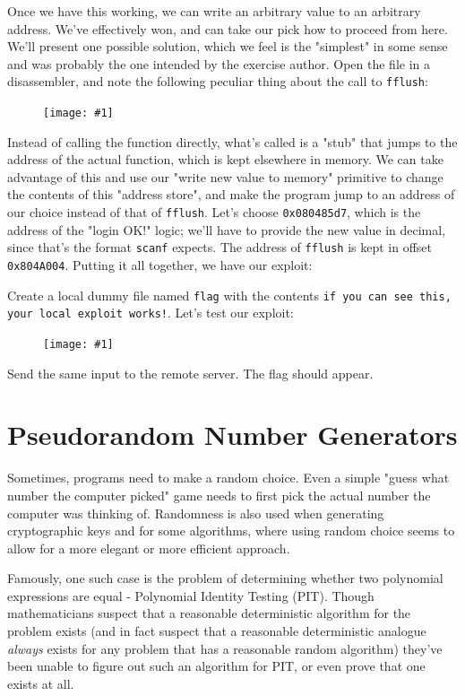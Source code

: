 \documentclass{article}
\newcommand{\displayimage}[1] {
\begin{figure}[H]
    \centering
    \texttt{[image: \#1]} 
\end{figure}
}
\newcommand{\xcode}[2]{\colorbox{ubuntuback}{\lstinline[language=#1]|#2|}}
\newcommand{\code}[1]{\colorbox{ubuntuback}{\texttt{#1}}}
\begin{document}
Once we have this working, we can write an arbitrary value to an arbitrary address. We've effectively won, and can take our pick how to proceed from here. We'll present one possible solution, which we feel is the "simplest" in some sense and was probably the one intended by the exercise author. Open the file in a disassembler, and note the following peculiar thing about the call to \xcode{C}{fflush}:

\displayimage{../04_passcode/fflush.png}

Instead of calling the function directly, what's called is a "stub" that jumps to the address of the actual function, which is kept elsewhere in memory. We can take advantage of this and use our "write new value to memory" primitive to change the contents of this "address store", and make the program jump to an address of our choice instead of that of \xcode{C}{fflush}. Let's choose \code{0x080485d7}, which is the address of the "login OK!" logic; we'll have to provide the new value in decimal, since that's the format \xcode{C}{scanf} expects. The address of \xcode{C}{fflush} is kept in offset \code{0x804A004}. Putting it all together, we have our exploit:



Create a local dummy file named \code{flag} with the contents \code{if you can see this, your local exploit works!}. Let's test our exploit:

\displayimage{../04_passcode/success.png}

Send the same input to the remote server. The flag should appear.

\section{Pseudorandom Number Generators}

Sometimes, programs need to make a random choice. Even a simple "guess what number the computer picked" game needs to first pick the actual number the computer was thinking of. Randomness is also used when generating cryptographic keys and for some algorithms, where using random choice seems to allow for a more elegant or more efficient approach.

Famously, one such case is the problem of determining whether two polynomial expressions are equal - Polynomial Identity Testing (PIT). Though mathematicians suspect that a reasonable deterministic algorithm for the problem exists (and in fact suspect that a reasonable deterministic analogue \textit{always} exists for any problem that has a reasonable random algorithm) they've been unable to figure out such an algorithm for PIT, or even prove that one exists at all.
\end{document}
